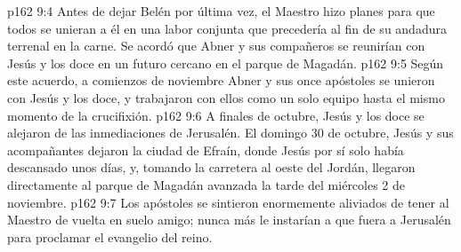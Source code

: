 \vs p162 9:4 \pc Antes de dejar Belén por última vez, el Maestro hizo planes para que todos se unieran a él en una labor conjunta que precedería al fin de su andadura terrenal en la carne. Se acordó que Abner y sus compañeros se reunirían con Jesús y los doce en un futuro cercano en el parque de Magadán.
\vs p162 9:5 Según este acuerdo, a comienzos de noviembre Abner y sus once apóstoles se unieron con Jesús y los doce, y trabajaron con ellos como un solo equipo hasta el mismo momento de la crucifixión.
\vs p162 9:6 A finales de octubre, Jesús y los doce se alejaron de las inmediaciones de Jerusalén. El domingo 30 de octubre, Jesús y sus acompañantes dejaron la ciudad de Efraín, donde Jesús por sí solo había descansado unos días, y, tomando la carretera al oeste del Jordán, llegaron directamente al parque de Magadán avanzada la tarde del miércoles 2 de noviembre.
\vs p162 9:7 Los apóstoles se sintieron enormemente aliviados de tener al Maestro de vuelta en suelo amigo; nunca más le instarían a que fuera a Jerusalén para proclamar el evangelio del reino.
